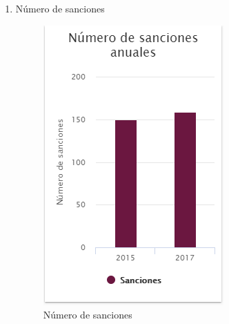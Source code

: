 \begin{itemize}
\begin{enumerate}
	\item Número de sanciones 
	\begin{figure}[hbtp]
	\includegraphics[scale=0.7]{images/InterfazMovil/IUGS15_sancionesAnos.PNG}
	\caption{Número de sanciones}
	\end{figure}
	
	\end{enumerate}
	
\end{itemize}